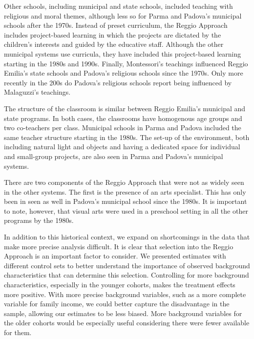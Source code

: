 Other schools, including municipal and state schools, included teaching with religious and moral themes, although less so for Parma and Padova's municipal schools after the 1970s. Instead of preset curriculum, the Reggio Approach includes project-based learning in which the projects are dictated by the children's interests and guided by the educative staff. Although the other municipal systems use curricula, they have included this project-based learning starting in the 1980s and 1990s. Finally, Montessori's teachings influenced Reggio Emilia's state schools and Padova's religious schools since the 1970s. Only more recently in the 200s do Padova's religious schools report being influenced by Malaguzzi's teachings. 

The structure of the classroom is similar between Reggio Emilia's municipal and state programs. In both cases, the classrooms have homogenous age groups and two co-teachers per class. Municipal schools in Parma and Padova included the same teacher structure starting in the 1980s. The set-up of the environment, both including natural light and objects and having a dedicated space for individual and small-group projects, are also seen in Parma and Padova's municipal systems.

There are two components of the Reggio Approach that were not as widely seen in the other systems. The first is the presence of an arts specialist. This has only been in seen as well in Padova's municipal school since the 1980s. It is important to note, however, that visual arts were used in a preschool setting in all the other programs by the 1980s.  

In addition to this historical context, we expand on shortcomings in the data that make more precise analysis difficult. It is clear that selection into the Reggio Approach is an important factor to consider. We presented estimates with different control sets to better understand the importance of observed background characteristics that can determine this selection. Controlling for more background characteristics, especially in the younger cohorts, makes the treatment effects more positive. With more precise background variables, such as a more complete variable for family income, we could better capture the disadvantage in the sample, allowing our estimates to be less biased. More background variables for the older cohorts would be especially useful considering there were fewer available for them.


